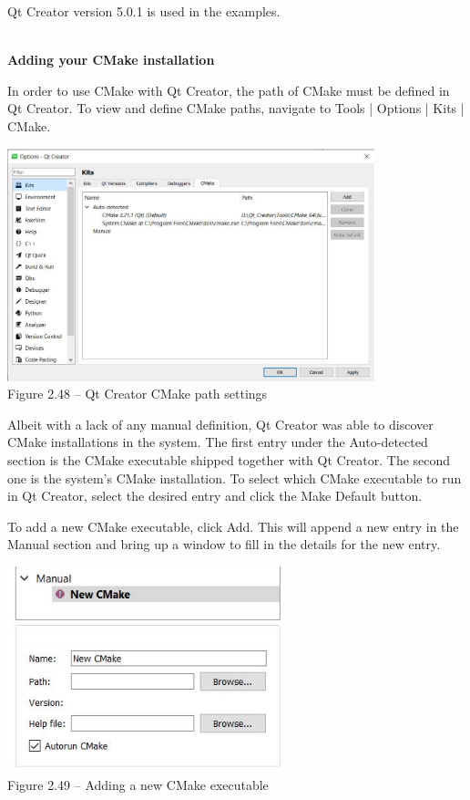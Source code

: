 Qt Creator version 5.0.1 is used in the examples.

\hspace*{\fill} \\ %
\noindent
\textbf{Adding your CMake installation}

In order to use CMake with Qt Creator, the path of CMake must be defined in Qt Creator. To view and define CMake paths, navigate to Tools | Options | Kits | CMake.

\begin{center}
\includegraphics[width=0.8\textwidth]{content/1/chapter2/images/48.jpg}\\
Figure 2.48 – Qt Creator CMake path settings
\end{center}

Albeit with a lack of any manual definition, Qt Creator was able to discover CMake installations in the system. The first entry under the Auto-detected section is the CMake executable shipped together with Qt Creator. The second one is the system's CMake installation. To select which CMake executable to run in Qt Creator, select the desired entry and click the Make Default button.

To add a new CMake executable, click Add. This will append a new entry in the Manual section and bring up a window to fill in the details for the new entry.

\begin{center}
\includegraphics[width=0.6\textwidth]{content/1/chapter2/images/49.jpg}\\
Figure 2.49 – Adding a new CMake executable
\end{center}

